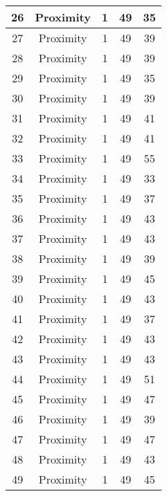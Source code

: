 \documentclass[results.tex]{subfiles}
\begin{document}
\begin{center}
\begin{tabular}{| c || c | c | c | c |}
    \hline
    26 & Proximity & 1 & 49 & 35 \\ 
    \hline
    27 & Proximity & 1 & 49 & 39 \\ 
    \hline
    28 & Proximity & 1 & 49 & 39 \\ 
    \hline
    29 & Proximity & 1 & 49 & 35 \\ 
    \hline
    30 & Proximity & 1 & 49 & 39 \\ 
    \hline
    31 & Proximity & 1 & 49 & 41 \\ 
    \hline
    32 & Proximity & 1 & 49 & 41 \\ 
    \hline
    33 & Proximity & 1 & 49 & 55 \\ 
    \hline
    34 & Proximity & 1 & 49 & 33 \\ 
    \hline
    35 & Proximity & 1 & 49 & 37 \\ 
    \hline
    36 & Proximity & 1 & 49 & 43 \\ 
    \hline
    37 & Proximity & 1 & 49 & 43 \\ 
    \hline
    38 & Proximity & 1 & 49 & 39 \\ 
    \hline
    39 & Proximity & 1 & 49 & 45 \\ 
    \hline
    40 & Proximity & 1 & 49 & 43 \\ 
    \hline
    41 & Proximity & 1 & 49 & 37 \\ 
    \hline
    42 & Proximity & 1 & 49 & 43 \\ 
    \hline
    43 & Proximity & 1 & 49 & 43 \\ 
    \hline
    44 & Proximity & 1 & 49 & 51 \\ 
    \hline
    45 & Proximity & 1 & 49 & 47 \\ 
    \hline
    46 & Proximity & 1 & 49 & 39 \\ 
    \hline
    47 & Proximity & 1 & 49 & 47 \\ 
    \hline
    48 & Proximity & 1 & 49 & 43 \\ 
    \hline
    49 & Proximity & 1 & 49 & 45 \\ 
    \hline   \end{tabular}
\end{center}
\end{document}
